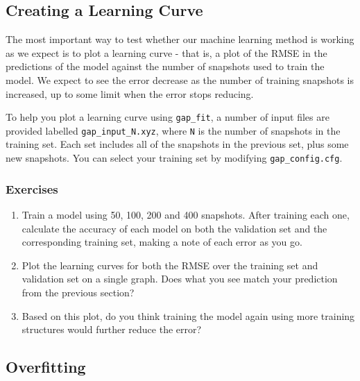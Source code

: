 \documentclass{article}
\begin{document}
\subsection{Creating a Learning Curve}

The most important way to test whether our machine learning method is working as we expect is to plot a learning curve - that is, a plot of the RMSE in the predictions of the model against the number of snapshots used to train the model. We expect to see the error decrease as the number of training snapshots is increased, up to some limit when the error stops reducing.

To help you plot a learning curve using \verb|gap_fit|, a number of input files are provided labelled \verb|gap_input_N.xyz|, where \verb|N| is the number of snapshots in the training set. Each set includes all of the snapshots in the previous set, plus some new snapshots. You can select your training set by modifying \verb|gap_config.cfg|.

\subsubsection*{Exercises}

\begin{enumerate}

\item Train a model using 50, 100, 200 and 400 snapshots. After training each one, calculate the accuracy of each model on both the validation set and the corresponding training set, making a note of each error as you go.
\item Plot the learning curves for both the RMSE over the training set and validation set on a single graph. Does what you see match your prediction from the previous section?
\item Based on this plot, do you think training the model again using more training structures would further reduce the error?

\end{enumerate}

\subsection{Overfitting}
\end{document}

